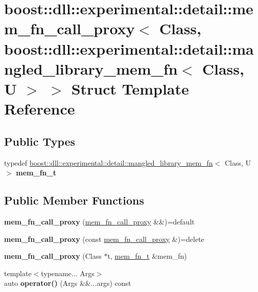 \hypertarget{a00217}{}\section{boost\+:\+:dll\+:\+:experimental\+:\+:detail\+:\+:mem\+\_\+fn\+\_\+call\+\_\+proxy$<$ Class, boost\+:\+:dll\+:\+:experimental\+:\+:detail\+:\+:mangled\+\_\+library\+\_\+mem\+\_\+fn$<$ Class, U $>$ $>$ Struct Template Reference}
\label{a00217}
\subsection*{Public Types}
\begin{DoxyCompactItemize}
\item 
typedef \hyperlink{a00211}{boost\+::dll\+::experimental\+::detail\+::mangled\+\_\+library\+\_\+mem\+\_\+fn}$<$ Class, U $>$ {\bfseries mem\+\_\+fn\+\_\+t}\hypertarget{a00217_ae3f81d15bc0e86d8cde5656ddd2a8b9f}{}\label{a00217_ae3f81d15bc0e86d8cde5656ddd2a8b9f}

\end{DoxyCompactItemize}
\subsection*{Public Member Functions}
\begin{DoxyCompactItemize}
\item 
{\bfseries mem\+\_\+fn\+\_\+call\+\_\+proxy} (\hyperlink{a00216}{mem\+\_\+fn\+\_\+call\+\_\+proxy} \&\&)=default\hypertarget{a00217_a69b3b0f027714af4cc8bcb23fcb9338b}{}\label{a00217_a69b3b0f027714af4cc8bcb23fcb9338b}

\item 
{\bfseries mem\+\_\+fn\+\_\+call\+\_\+proxy} (const \hyperlink{a00216}{mem\+\_\+fn\+\_\+call\+\_\+proxy} \&)=delete\hypertarget{a00217_a43f5678e22e26416850031a516a06730}{}\label{a00217_a43f5678e22e26416850031a516a06730}

\item 
{\bfseries mem\+\_\+fn\+\_\+call\+\_\+proxy} (Class $\ast$t, \hyperlink{a00211}{mem\+\_\+fn\+\_\+t} \&mem\+\_\+fn)\hypertarget{a00217_a8f79c39b6fcc86bd5ca6e12b998c708a}{}\label{a00217_a8f79c39b6fcc86bd5ca6e12b998c708a}

\item 
{\footnotesize template$<$typename... Args$>$ }\\auto {\bfseries operator()} (Args \&\&...args) const \hypertarget{a00217_a56e830d6fca16817538717cdd8cf6495}{}\label{a00217_a56e830d6fca16817538717cdd8cf6495}

\end{DoxyCompactItemize}
